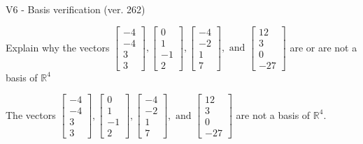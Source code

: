 \begin{exercise}
  \begin{exerciseTitle}V6 - Basis verification (ver. 262)\end{exerciseTitle}
  \begin{exerciseStatement}
    Explain why the vectors \(\left[\begin{array}{r}
-4 \\
-4 \\
3 \\
3
\end{array}\right] , \left[\begin{array}{r}
0 \\
1 \\
-1 \\
2
\end{array}\right] , \left[\begin{array}{r}
-4 \\
-2 \\
1 \\
7
\end{array}\right] , \text{ and } \left[\begin{array}{r}
12 \\
3 \\
0 \\
-27
\end{array}\right]\) are or are not a basis of \(\mathbb{R}^4\)	


  \end{exerciseStatement}
  \begin{exerciseAnswer}
   The vectors \(\left[\begin{array}{r}
-4 \\
-4 \\
3 \\
3
\end{array}\right] , \left[\begin{array}{r}
0 \\
1 \\
-1 \\
2
\end{array}\right] , \left[\begin{array}{r}
-4 \\
-2 \\
1 \\
7
\end{array}\right] , \text{ and } \left[\begin{array}{r}
12 \\
3 \\
0 \\
-27
\end{array}\right]\) 
  	 are not  a basis of \(\mathbb{R}^4\).
  


  \end{exerciseAnswer}
\end{exercise}